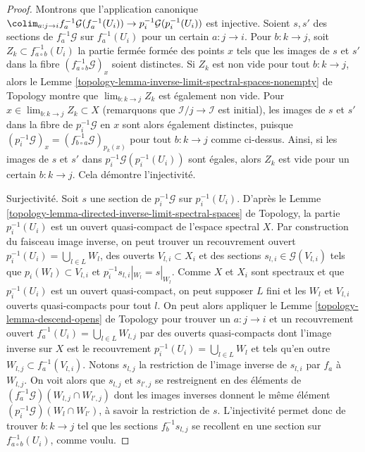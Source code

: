 \begin{proof}
Montrons que l'application canonique
$\colim_{a : j \to i} f_a^{-1}\mathcal{G}(f_a^{-1}(U_i)) \to
p_i^{-1}\mathcal{G}(p_i^{-1}(U_i))$ est injective.
Soient $s, s'$ des sections de $f_a^{-1}\mathcal{G}$
sur $f_a^{-1}(U_i)$ pour un certain $a : j \to i$. Pour
$b : k \to j$, soit $Z_k \subset f_{a \circ b}^{-1}(U_i)$
la partie fermée formée des points $x$ tels que les images de
$s$ et $s'$ dans la fibre $(f_{a \circ b}^{-1}\mathcal{G})_x$
soient distinctes. Si $Z_k$ est non vide pour tout $b : k \to j$, alors le
Lemme \ref{topology-lemma-inverse-limit-spectral-spaces-nonempty} de Topology
montre que $\lim_{b : k \to j} Z_k$ est également non vide.
Pour $x \in \lim_{b : k \to j} Z_k \subset X$
(remarquons que $\mathcal{I}/j \to \mathcal{I}$ est initial),
les images de $s$ et $s'$ dans la fibre de
$p_i^{-1}\mathcal{G}$ en $x$ sont alors également distinctes, puisque
$(p_i^{-1}\mathcal{G})_x = (f_{b \circ a}^{-1}\mathcal{G})_{p_k(x)}$
pour tout $b : k \to j$ comme ci-dessus. Ainsi, si les images de $s$ et $s'$
dans $p_i^{-1}\mathcal{G}(p_i^{-1}(U_i))$ sont égales, alors $Z_k$
est vide pour un certain $b : k \to j$. Cela démontre l'injectivité.

\medskip\noindent
Surjectivité. Soit $s$ une section de $p_i^{-1}\mathcal{G}$ sur
$p_i^{-1}(U_i)$. D'après le
Lemme \ref{topology-lemma-directed-inverse-limit-spectral-spaces} de Topology,
la partie $p_i^{-1}(U_i)$ est un ouvert quasi-compact de l'espace spectral $X$.
Par construction du faisceau image inverse, on peut trouver un recouvrement ouvert
$p_i^{-1}(U_i) = \bigcup_{l \in L} W_l$,
des ouverts $V_{l, i} \subset X_i$ et
des sections $s_{l, i} \in \mathcal{G}(V_{l, i})$
tels que $p_i(W_l) \subset V_{l, i}$ et $p_i^{-1}s_{l, i}|_{W_l} = s|_{W_l}$.
Comme $X$ et $X_i$ sont spectraux et que $p_i^{-1}(U_i)$ est un ouvert quasi-compact,
on peut supposer $L$ fini et les $W_l$ et $V_{l, i}$ ouverts quasi-compacts
pour tout $l$. On peut alors appliquer le
Lemme \ref{topology-lemma-descend-opens} de Topology
pour trouver un $a : j \to i$ et un recouvrement ouvert
$f_a^{-1}(U_i) = \bigcup_{l \in L} W_{l, j}$ par des ouverts
quasi-compacts dont l'image inverse sur $X$ est le recouvrement
$p_i^{-1}(U_i) = \bigcup_{l \in L} W_l$
et tels qu'en outre $W_{l, j} \subset f_a^{-1}(V_{l, i})$.
Notons $s_{l, j}$ la restriction de l'image inverse de $s_{l, i}$
par $f_a$ à $W_{l, j}$. On voit alors que $s_{l, j}$ et $s_{l', j}$
se restreignent en des éléments de $(f_a^{-1}\mathcal{G})(W_{l, j} \cap W_{l', j})$
dont les images inverses donnent le même élément $(p_i^{-1}\mathcal{G})(W_l \cap W_{l'})$,
à savoir la restriction de $s$. L'injectivité permet donc de trouver
$b : k \to j$ tel que les sections $f_b^{-1}s_{l, j}$
se recollent en une section sur $f_{a \circ b}^{-1}(U_i)$, comme voulu.
\end{proof}

